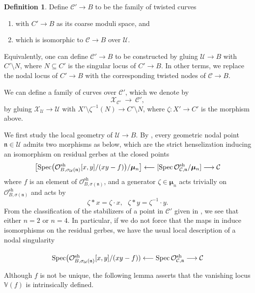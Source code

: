 \documentclass[a4paper,12pt]{amsart}
\newcommand{\mtf}[1]{\mathfrak{#1}}
\DeclareMathOperator{\Spec}{Spec}
\DeclareMathOperator{\sh}{sh}
\newcommand{\bV}{{\mathbb V}}
\newcommand{\cX}{{\mathcal{X}}}
\newcommand{\cO}{{\mathcal{O}}}
\newcommand{\cU}{{\mathcal{U}}}
\newcommand{\bmu}{\bm{\mu}}
\newcommand\spec{\text{\rm Spec}}
\newcommand\cC{{\mathcal{C}}}
\theoremstyle{definition}
\newtheorem{defn}[theorem]{Definition}
\theoremstyle{remark}
\begin{document}
\begin{defn}
    Define $\cC'\to B$ to be the family of twisted curves 
    \begin{enumerate}
        \item with $C'\to B$ as its coarse moduli space, and
        \item which is isomorphic to $\cC\to B$ over $\cU$.
    \end{enumerate}
Equivalently, one can define $\cC'\rightarrow B$ to be constructed by gluing $\cU\rightarrow B$ with $C'\setminus N$, where $N\subseteq C'$ is the singular locus of $C'\to B$. In other terms, we replace the nodal locus of $C'\to B$ with the corresponding twisted nodes of $\cC\to B$.

We can define a family of curves over $\cC'$, which we denote by $$\cX_{\cC'}\ \longrightarrow \ \cC',$$ by gluing $\cX_\cU\rightarrow \cU$ with $X'\setminus \zeta^{-1}(N)\rightarrow C'\setminus N$, where $\zeta\colon X'\to C'$ is the morphism above.
\end{defn}



We first study the local geometry of $\cU\to B$. By \cite[Proposition 2.2 (b)]{olsson2007log}, every geometric nodal point $\mtf{n}\in \cU$ admits two morphisms as below, which are the strict henselization inducing an isomorphism on residual gerbes at the closed points
\begin{equation}\label{equation_local_description_node}
\big[\spec\big(\cO_{B,\sigma_\cU(\mtf{n})}^{\sh}[x,y]/(xy-f)\big)/\bmu_n\big]\longleftarrow [\Spec\cO_{\cC,\mtf{n}}^{\sh}/\bmu_n] \longrightarrow \cC
\end{equation}
where $f$ is an element of $\cO_{B,\sigma(\mtf{n})}^{\sh}$, and a generator $\zeta \in \bmu_n$ acts trivially on $\cO_{B,\sigma(\mtf{n})}^{\sh}$ and acts by $$\zeta*x = \zeta \cdot x, \ \ \ \zeta*y=\zeta^{-1}\cdot y.$$
From the classification of the stabilizers of a point in $\cC'$ given in , we see that either $n=2$ or $n=4$. In particular, if we do not force that the maps in  induce isomorphisms on the residual gerbes, we have the usual local description of a nodal singularity 

\begin{equation}\label{equation_local_description_node_2}
\begin{tikzcd}\spec\big(\cO_{B,\sigma_\cU(\mtf{n})}^{\sh}[x,y]/(xy-f))\longleftarrow \Spec\cO_{\cC,\mtf{n}}^{\sh} \longrightarrow \cC
\end{tikzcd}
\end{equation}
Although $f$ is not be unique, the following lemma asserts that the vanishing locus $\bV(f)$ is intrinsically defined. 
\end{document}
